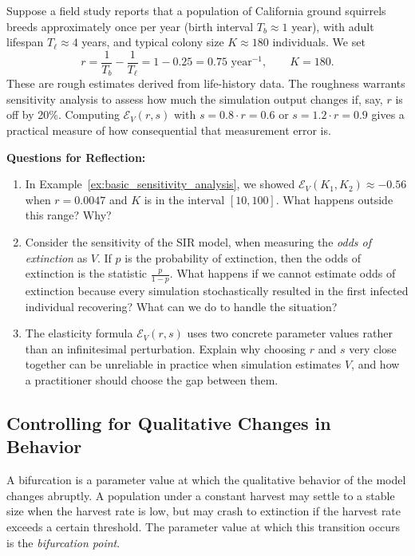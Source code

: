 \begin{example}\label{ex:logistic_growth_parameterizing}
Suppose a field study reports that a population of California ground squirrels breeds approximately once per year (birth interval $T_b \approx 1$ year), with adult lifespan $T_\ell \approx 4$ years, and typical colony size $K \approx 180$ individuals. We set
\[r = \frac{1}{T_b} - \frac{1}{T_\ell} = 1 - 0.25 = 0.75 \text{ year}^{-1}, \qquad K = 180.\]
These are rough estimates derived from life-history data. The roughness warrants sensitivity analysis to assess how much the simulation output changes if, say, $r$ is off by 20\%. Computing $\mathcal{E}_{V}(r, s)$ with $s = 0.8 \cdot r = 0.6$ or $s = 1.2 \cdot r = 0.9$ gives a practical measure of how consequential that measurement error is.\\
\end{example}

\noindent \textup{{\bf Questions for Reflection:}}
\begin{enumerate}
\item In Example~\ref{ex:basic_sensitivity_analysis}, we showed $\mathcal{E}_{V}(K_1,K_2) \approx -0.56$ when $r = 0.0047$ and $K$ is in the interval $[10, 100]$. What happens outside this range? Why?
\item Consider the sensitivity of the SIR model, when measuring the \textit{odds of extinction} as $V$. If $p$ is the probability of extinction, then the odds of extinction is the statistic $\frac{p}{1-p}$. What happens if we cannot estimate odds of extinction because every simulation stochastically resulted in the first infected individual recovering? What can we do to handle the situation?

\item The elasticity formula $\mathcal{E}_V(r,s)$ uses two concrete parameter values rather than an infinitesimal perturbation. Explain why choosing $r$ and $s$ very close together can be unreliable in practice when simulation estimates $V$, and how a practitioner should choose the gap between them.
\end{enumerate}

\subsection{Controlling for Qualitative Changes in Behavior}\label{subsec:qualitative_changes}


A bifurcation is a parameter value at which the qualitative behavior of the model changes abruptly. A population under a constant harvest may settle to a stable size when the harvest rate is low, but may crash to extinction if the harvest rate exceeds a certain threshold.
The parameter value at which this transition occurs is the \textit{bifurcation point}.

